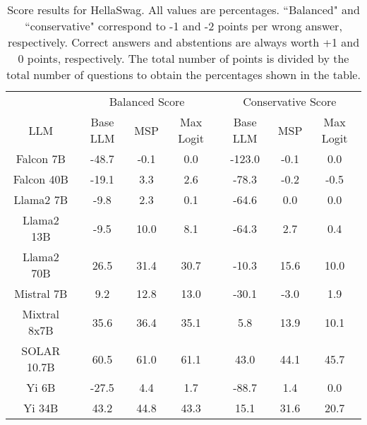 \begin{table*}
\centering
\begin{tabular}{c|c|c|c|c|c|c}
& \multicolumn{3}{c|}{Balanced Score} & \multicolumn{3}{c}{Conservative Score} \\ 
LLM & Base LLM & MSP & Max Logit & Base LLM & MSP & Max Logit\\ \hline
Falcon 7B & -48.7 & -0.1 & 0.0 & -123.0 & -0.1 & 0.0\\
Falcon 40B & -19.1 & 3.3 & 2.6 & -78.3 & -0.2 & -0.5\\
Llama2 7B & -9.8 & 2.3 & 0.1 & -64.6 & 0.0 & 0.0\\
Llama2 13B & -9.5 & 10.0 & 8.1 & -64.3 & 2.7 & 0.4\\
Llama2 70B & 26.5 & 31.4 & 30.7 & -10.3 & 15.6 & 10.0\\
Mistral 7B & 9.2 & 12.8 & 13.0 & -30.1 & -3.0 & 1.9\\
Mixtral 8x7B & 35.6 & 36.4 & 35.1 & 5.8 & 13.9 & 10.1\\
SOLAR 10.7B & 60.5 & 61.0 & 61.1 & 43.0 & 44.1 & 45.7\\
Yi 6B & -27.5 & 4.4 & 1.7 & -88.7 & 1.4 & 0.0\\
Yi 34B & 43.2 & 44.8 & 43.3 & 15.1 & 31.6 & 20.7\\
\hline
\end{tabular}
\caption{Score results for HellaSwag. All values are percentages. ``Balanced" and ``conservative" correspond to -1 and -2 points per wrong answer, respectively. Correct answers and abstentions are always worth +1 and 0 points, respectively. The total number of points is divided by the total number of questions to obtain the percentages shown in the table.}
\label{tab:hellaswag_score}
\end{table*}
